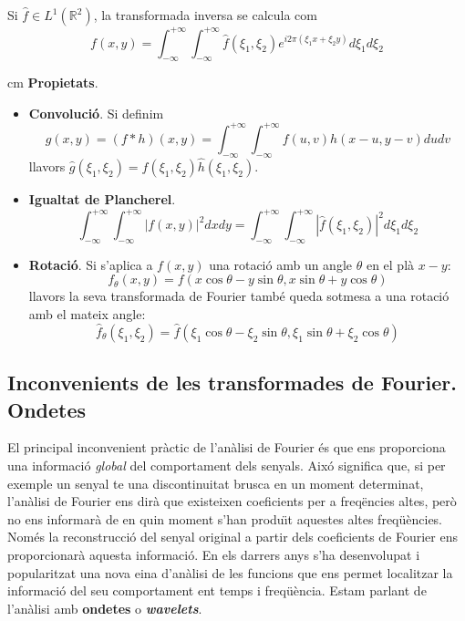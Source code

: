 \documentclass{article}
\def\R{\mathbb R}
\begin{document}
Si $\hat{f} \in L^1(\R^2)$, la transformada inversa se calcula com
\begin{equation}
\label{ITF2D}
f(x,y)=\int_{-\infty}^{+\infty} \int_{-\infty}^{+\infty} 
\hat{f}(\xi_1,\xi_2) e^{i 2 \pi (\xi_1 x+\xi_2 y)} d\xi_1 d\xi_2
\end{equation}

 cm
\noindent
{\bf Propietats}.
\begin{itemize}
\item {\bf Convoluci\'o}. Si definim 
\[
g(x, y)=(f * h)(x,y)= \int_{-\infty}^{+\infty} \int_{-\infty}^{+\infty} 
f(u, v) h(x-u,y-v) du dv
\]
\noindent
llavors $\hat{g}(\xi_1,\xi_2)=\hat{f}(\xi_1,\xi_2) \hat{h}(\xi_1,\xi_2)$.

\item {\bf Igualtat de Plancherel}.
\[
\int_{-\infty}^{+\infty} \int_{-\infty}^{+\infty} |f(x,y)|^2 dx dy=
\int_{-\infty}^{+\infty} \int_{-\infty}^{+\infty} 
|\hat{f}(\xi_1,\xi_2)|^2 d\xi_1 d\xi_2
\]

\item {\bf Rotaci\'o}. Si s'aplica a $f(x,y)$ una rotaci\'o amb un angle
$\theta$ en el pl\`a $x-y$:
\[
f_\theta(x,y)=f(x \cos\theta-y \sin\theta, x\sin\theta+y\cos\theta)
\]
\noindent
llavors la seva transformada de Fourier tamb\'e queda sotmesa a una rotaci\'o
amb el mateix angle:
\[
\hat{f}_\theta(\xi_1,\xi_2)=\hat{f}(\xi_1 \cos\theta-\xi_2 \sin\theta, 
\xi_1 \sin\theta+\xi_2 \cos\theta)
\]

\end{itemize}

\subsection{Inconvenients de les transformades de Fourier. Ondetes}
El principal inconvenient pr\`actic de l'an\`alisi de Fourier \'es que
ens proporciona una informaci\'o {\it global} del comportament dels senyals. 
Aix\'o significa que, si per exemple un senyal te una discontinuitat
brusca en un moment determinat, l'an\`alisi de Fourier ens dir\`a
que existeixen coeficients per a freq\"encies altes, per\`o no 
ens informar\`a de en quin moment s'han produ\"\i t aquestes
altes freq\"u\`encies. Nom\'es la reconstrucci\'o del senyal
original a partir dels coeficients de Fourier ens proporcionar\`a
aquesta informaci\'o.
\newline
En els darrers anys s'ha desenvolupat i popularitzat una nova eina
d'an\`alisi de les funcions que ens permet localitzar la informaci\'o
del seu comportament ent temps i freq\"u\`encia. Estam parlant de
l'an\`alisi amb {\bf ondetes} o {\bf \it wavelets}.  
\end{document}
